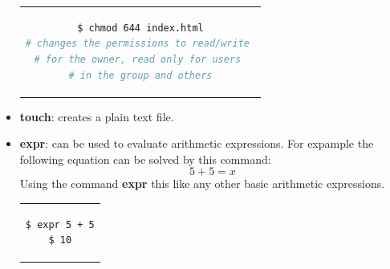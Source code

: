 \documentclass[12pt,a4paper]{article}
\begin{document}
\begin{itemize}
\begin{center}
\begin{tabular}{c}
\begin{lstlisting}[language=bash]
$ chmod 644 index.html
# changes the permissions to read/write 
# for the owner, read only for users 
# in the group and others
\end{lstlisting}
\end{tabular}
\end{center}
\item \textbf{ls}: lists files in the current directory. The command can be modified to list hidden file or to work recursively:

\begin{center}
\begin{tabular}{c}
\begin{lstlisting}[language=bash]
$ ls -all
# lists all files in the directory including
# hidden files
\end{lstlisting}
\end{tabular}
\end{center}
\item \textbf{touch}: creates a plain text file.
\item \textbf{expr}: can be used to evaluate arithmetic expressions. For expample the following equation can be solved by this command:
\begin{equation}
5 + 5 = x
\end{equation}
Using the command \textbf{expr} this like any other basic arithmetic expressions.
 
\begin{center}
\begin{tabular}{c}
\begin{lstlisting}[language=bash]
$ expr 5 + 5
$ 10
\end{lstlisting}
\end{tabular}
\end{center}
\end{itemize}


\end{document}
